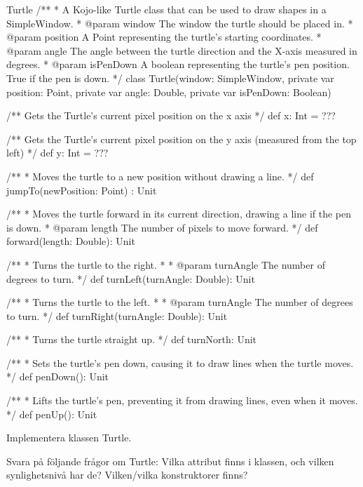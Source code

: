 \begin{ScalaSpec}{Turtle}
/**
  * A Kojo-like Turtle class that can be used to draw shapes
    in a SimpleWindow.
  * @param window     The window the turtle should be placed in.
  * @param position   A Point representing the turtle's starting
                      coordinates.
  * @param angle      The angle between the turtle direction and
                      the X-axis measured in degrees.
  * @param isPenDown  A boolean representing the turtle's pen
                      position. True if the pen is down.
  */
class Turtle(window: SimpleWindow, private var position: Point,
      private var angle: Double, private var isPenDown: Boolean) {

  /** Gets the Turtle's current pixel position on the x axis */
  def x: Int = ???

  /** Gets the Turtle's current pixel position on the y axis
      (measured from the top left) */
  def y: Int = ???

  /**
    * Moves the turtle to a new position without drawing a line.
    */
  def jumpTo(newPosition: Point) : Unit

  /**
    * Moves the turtle forward in its current direction, drawing
      a line if the pen is down.
    * @param length The number of pixels to move forward.
    */
  def forward(length: Double): Unit

  /**
    * Turns the turtle to the right.
    *
    * @param turnAngle The number of degrees to turn.
    */
  def turnLeft(turnAngle: Double): Unit

  /**
    * Turns the turtle to the left.
    *
    * @param turnAngle The number of degrees to turn.
    */
  def turnRight(turnAngle: Double): Unit

  /**
    * Turns the turtle straight up.
    */
  def turnNorth: Unit

  /**
    * Sets the turtle's pen down, causing it to draw lines when
      the turtle moves.
    */
  def penDown(): Unit

  /**
    * Lifts the turtle's pen, preventing it from drawing lines,
      even when it moves.
    */
  def penUp(): Unit
}

\end{ScalaSpec}

\Subtask Implementera klassen Turtle.

\Subtask Svara på följande frågor om Turtle: Vilka attribut finns i klassen, och vilken synlighetsnivå har de? Vilken/vilka konstruktorer finns? 


